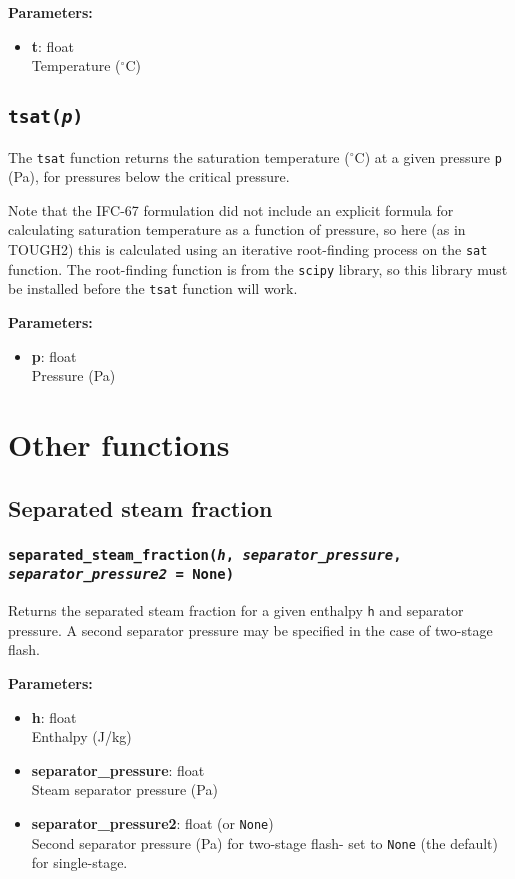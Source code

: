 \textbf{Parameters:}
\begin{itemize}
\item \textbf{t}: float\\
  Temperature ($^{\circ}$C)
\end{itemize}

\subsection{\texttt{tsat(\emph{p})}}
\label{sec:t2thermo:tsat}

The \texttt{tsat} function returns the saturation temperature ($^{\circ}$C) at a given pressure \texttt{p} (Pa), for pressures below the critical pressure.

Note that the IFC-67 formulation did not include an explicit formula for calculating saturation temperature as a function of pressure, so here (as in TOUGH2) this is calculated using an iterative root-finding process on the \texttt{sat} function.  The root-finding function is from the \texttt{scipy} library, so this library must be installed before the \texttt{tsat} function will work.

\textbf{Parameters:}
\begin{itemize}
\item \textbf{p}: float\\
  Pressure (Pa)
\end{itemize}

\section{Other functions}

\subsection{Separated steam fraction}

\subsubsection{\texttt{separated\_steam\_fraction(\emph{h}, \emph{separator\_pressure}, \emph{separator\_pressure2} = None)}}
\label{sec:t2thermo:separated_steam_fraction}

Returns the separated steam fraction for a given enthalpy \texttt{h} and separator pressure.  A second separator pressure may be specified in the case of two-stage flash.

\textbf{Parameters:}
\begin{itemize}
\item \textbf{h}: float\\
  Enthalpy (J/kg)
\item \textbf{separator\_pressure}: float\\
  Steam separator pressure (Pa)
\item \textbf{separator\_pressure2}: float (or \texttt{None})\\
  Second separator pressure (Pa) for two-stage flash- set to \texttt{None} (the default) for single-stage.
\end{itemize}

